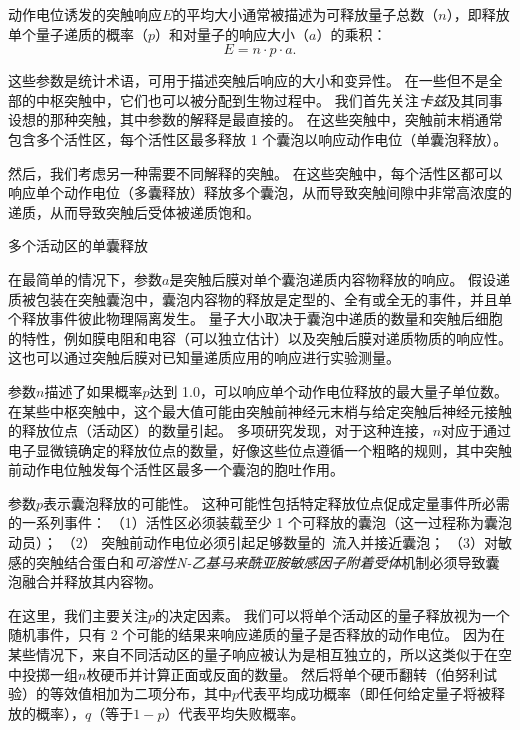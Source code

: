 \begin{proposition}[突触强度取决于递质释放的概率和其他量子参数] \label{box:15_1}
	
	\quad \quad 动作电位诱发的突触响应$E$的平均大小通常被描述为可释放量子总数（$n$），即释放单个量子递质的概率（$p$）和对量子的响应大小（$a$）的乘积：
	\begin{equation}\label{eq:15_quantum_response}
		E = n \cdot p \cdot a.
	\end{equation}
	
	\quad \quad 这些参数是统计术语，可用于描述突触后响应的大小和变异性。
	在一些但不是全部的中枢突触中，它们也可以被分配到生物过程中。
	我们首先关注\textit{卡兹}及其同事设想的那种突触，其中参数的解释是最直接的。
	在这些突触中，突触前末梢通常包含多个活性区，每个活性区最多释放 1 个囊泡以响应动作电位（单囊泡释放）。
	
	\quad \quad 然后，我们考虑另一种需要不同解释的突触。
	在这些突触中，每个活性区都可以响应单个动作电位（多囊释放）释放多个囊泡，从而导致突触间隙中非常高浓度的递质，从而导致突触后受体被递质饱和。
	
	\quad \quad 多个活动区的单囊释放
	
	\quad \quad 在最简单的情况下，参数$a$是突触后膜对单个囊泡递质内容物释放的响应。
	假设递质被包装在突触囊泡中，囊泡内容物的释放是定型的、全有或全无的事件，并且单个释放事件彼此物理隔离发生。
	量子大小取决于囊泡中递质的数量和突触后细胞的特性，例如膜电阻和电容（可以独立估计）以及突触后膜对递质物质的响应性。
	这也可以通过突触后膜对已知量递质应用的响应进行实验测量。
	
	\quad \quad 参数$ n $描述了如果概率$ p $达到 1.0，可以响应单个动作电位释放的最大量子单位数。
	在某些中枢突触中，这个最大值可能由突触前神经元末梢与给定突触后神经元接触的释放位点（活动区）的数量引起。
	多项研究发现，对于这种连接，$ n $对应于通过电子显微镜确定的释放位点的数量，好像这些位点遵循一个粗略的规则，其中突触前动作电位触发每个活性区最多一个囊泡的胞吐作用。
	
	\quad \quad 参数$ p $表示囊泡释放的可能性。
	这种可能性包括特定释放位点促成定量事件所必需的一系列事件：
	（1）活性区必须装载至少 1 个可释放的囊泡（这一过程称为囊泡动员）；
	（2） 突触前动作电位必须引起足够数量的~流入并接近囊泡；
	（3）对敏感的突触结合蛋白和\textit{可溶性N-乙基马来酰亚胺敏感因子附着受体}机制必须导致囊泡融合并释放其内容物。
	
	\quad \quad 在这里，我们主要关注$ p $的决定因素。
	我们可以将单个活动区的量子释放视为一个随机事件，只有 2 个可能的结果来响应递质的量子是否释放的动作电位。
	因为在某些情况下，来自不同活动区的量子响应被认为是相互独立的，所以这类似于在空中投掷一组$n$枚硬币并计算正面或反面的数量。
	然后将单个硬币翻转（伯努利试验）的等效值相加为二项分布，其中$ p $代表平均成功概率（即任何给定量子将被释放的概率），$ q $（等于$ 1-p $）代表平均失败概率。
	

\end{proposition}
